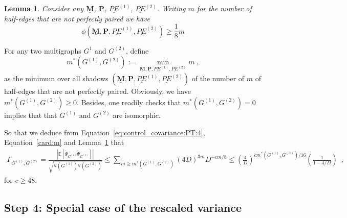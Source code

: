\documentclass{article}
\newtheorem{lemma}{Lemma}
\begin{document}
\begin{lemma}\label{lem:lower_bound_psi}
Consider any $\underline{\mathbf{M}}$, $\underline{\mathbf{P}}$, $\underline{PE}^{(1)}$, $\underline{PE}^{(2)}$. Writing $m$ for the number of half-edges that are not perfectly paired we have 
\[
    \phi(\underline{\mathbf{M}},\underline{\mathbf{P}},\underline{PE}^{(1)},\underline{PE}^{(2)})\geq \frac{1}{8} m 
\]
\end{lemma}


For any two multigraphs $G^{1}$ and $G^{(2)}$, define 
\begin{equation}\label{eq:definition:m*}
    m^*(G^{(1)},G^{(2)}) := \min_{\underline{\mathbf{M}},\underline{\mathbf{P}},\underline{PE}^{(1)},\underline{PE}^{(2)}} 
    m \ , 
\end{equation}
as the minimum over all shadows $(\underline{\mathbf{M}},\underline{\mathbf{P}},\underline{PE}^{(1)},\underline{PE}^{(2)})$ of the number of $m$ of half-edges that are not perfectly paired. Obviously, we have $m^*(G^{(1)},G^{(2)})\geq 0$. Besides, one readily checks that $m^*(G^{(1)},G^{(2)})=0$ implies that that $G^{(1)}$ and $G^{(2)}$ are isomorphic. 

So that we deduce from Equation~\eqref{eq:control_covariance:PT:4}, Equation~\eqref{card:m} and Lemma~\ref{lem:lower_bound_psi} that
\begin{eqnarray}\label{eq:control_covariance:PT:5}
\Gamma_{G^{(1)},G^{(2)}} =     \frac{ \left| \mathbb{E}[\widetilde{\Psi}_{G^{(1)}} \widetilde{\Psi}_{G^{(2)}}]\right|}{\sqrt{\mathbb{V}(G^{(1)})\mathbb{V}(G^{(2)})}}  \leq   \sum_{m\geq m^*(G^{(1)},G^{(2)})} (4D)^{3m} D^{-cm/8} \leq  \left(\frac{4}{D}\right)^{cm^*(G^{(1)},G^{(2)})/16}\left(\frac{1}{1- 4/D}\right) \enspace ,
\end{eqnarray}
for $c \geq 48$.
\subsection{Step 4: Special case of the rescaled variance}
\end{document}
